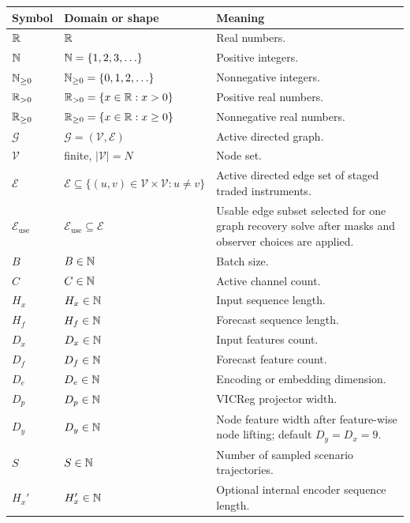 \begin{center}
\begin{longtable}{>{\raggedright\arraybackslash}p{}
                  >{\raggedright\arraybackslash}p{}
                  >{\raggedright\arraybackslash}p{}}
\toprule
Symbol & Domain or shape & Meaning \\
\midrule
$\mathbb{R}$ & $\mathbb{R}$ & Real numbers. \\
$\mathbb{N}$ & $\mathbb{N} = \{1,2,3,\ldots\}$ & Positive integers. \\
$\mathbb{N}_{\ge 0}$ & $\mathbb{N}_{\ge 0} = \{0,1,2,\ldots\}$ & Nonnegative integers. \\
$\mathbb{R}_{>0}$ & $\mathbb{R}_{>0} = \{x \in \mathbb{R} : x > 0\}$ & Positive real numbers. \\
$\mathbb{R}_{\ge 0}$ & $\mathbb{R}_{\ge 0} = \{x \in \mathbb{R} : x \ge 0\}$ & Nonnegative real numbers. \\
\midrule
$\mathcal{G}$ & $\mathcal{G}=(\mathcal{V},\mathcal{E})$ & Active directed graph. \\
$\mathcal{V}$ & finite, $|\mathcal{V}|=N$ & Node set. \\
$\mathcal{E}$ & $\mathcal{E}\subseteq\{(u,v)\in\mathcal{V}\times\mathcal{V}:u\ne v\}$ & Active directed edge set of staged traded instruments. \\
$\mathcal{E}_{\mathrm{use}}$ & $\mathcal{E}_{\mathrm{use}}\subseteq\mathcal{E}$ & Usable edge subset selected for one graph recovery solve after masks and observer choices are applied. \\
\midrule
$B$ & $B \in \mathbb{N}$ & Batch size. \\
$C$ & $C \in \mathbb{N}$ & Active channel count. \\
$H_x$ & $H_x \in \mathbb{N}$ & Input sequence length. \\
$H_f$ & $H_f \in \mathbb{N}$ & Forecast sequence length. \\
$D_x$ & $D_x \in \mathbb{N}$ & Input features count. \\
$D_f$ & $D_f \in \mathbb{N}$ & Forecast feature count. \\
$D_e$ & $D_e \in \mathbb{N}$ & Encoding or embedding dimension. \\
$D_p$ & $D_p \in \mathbb{N}$ & VICReg projector width. \\
$D_y$ & $D_y\in\mathbb{N}$ & Node feature width after feature-wise node lifting; default $D_y=D_x=9$. \\
$S$ & $S\in\mathbb{N}$ & Number of sampled scenario trajectories. \\
$H_x'$ & $H_x' \in \mathbb{N}$ & Optional internal encoder sequence length. \\

\end{longtable}
\end{center}
